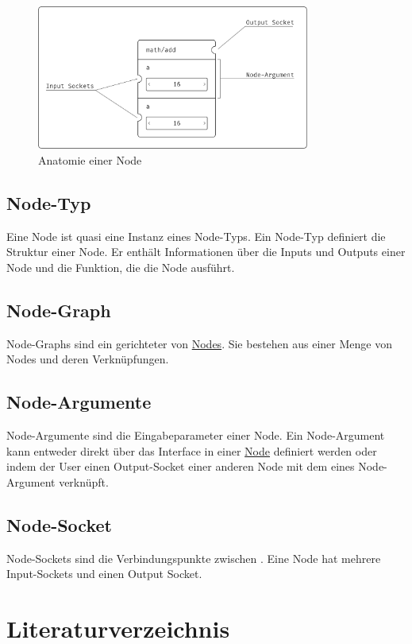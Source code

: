 \documentclass[ngerman]{article}
\begin{document}
\begin{figure}[htbp]
    \centering
    \includegraphics[width=0.8\textwidth]{graphics/NODE_ANATOMY.pdf}
    \caption{Anatomie einer Node}
    \label{sec:NODE_ANATOMY}
\end{figure}

\subsection{Node-Typ}
\label{sec:Node-Typ}
Eine Node ist quasi eine Instanz eines Node-Typs. Ein Node-Typ definiert die Struktur einer Node. Er enthält Informationen über die Inputs und Outputs einer Node und die Funktion, die die Node ausführt.

\subsection{Node-Graph}
\label{sec:Node-Graph}
Node-Graphs sind ein gerichteter  von \hyperref[sec:Node]{Nodes}. Sie bestehen aus einer Menge von Nodes und deren Verknüpfungen. 

\subsection{Node-Argumente}
\label{sec:Node-Argumente}
Node-Argumente sind die Eingabeparameter einer Node. Ein Node-Argument kann entweder direkt über das Interface in einer \hyperref[sec:Node]{Node} definiert werden oder indem der User einen Output-Socket einer anderen Node mit dem  eines Node-Argument verknüpft.

\subsection{Node-Socket}
\label{sec:Node-Socket}
Node-Sockets sind die Verbindungspunkte zwischen . Eine Node hat mehrere Input-Sockets und einen Output Socket.


\pagebreak
\section{Literaturverzeichnis}

\printbibliography
\end{document}
